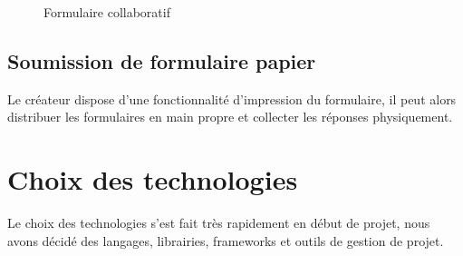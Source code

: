 \documentclass{sigplanconf}
\begin{document}
\begin{figure}
\begin{center}
\end{center}
\caption{Formulaire collaboratif}
\label{scenarios}
\end{figure}

\subsection{Soumission de formulaire papier}
Le créateur dispose d’une fonctionnalité d’impression du formulaire, il peut alors distribuer les formulaires en main propre et collecter les réponses physiquement. \\


\section{Choix des technologies}
Le choix des technologies s’est fait très rapidement en début de projet, nous avons décidé des langages, librairies, frameworks et outils de gestion de projet.
\end{document}

